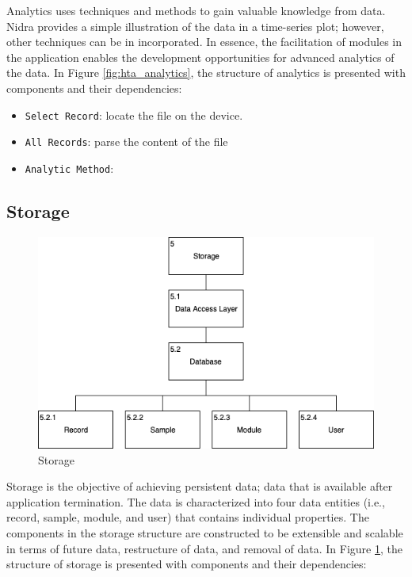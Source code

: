 Analytics uses techniques and methods to gain valuable knowledge from data. Nidra provides a simple illustration of the data in a time-series plot; however, other techniques can be in incorporated. In essence, the facilitation of modules in the application enables the development opportunities for advanced analytics of the data. In Figure \ref{fig:hta_analytics}, the structure of analytics is presented with components and their dependencies: 

\begin{itemize}
    \item[4.1.1] \verb|Select Record|: locate the file on the device.
    \item[4.1.2] \verb|All Records|: parse the content of the file 
    \item[4.2] \verb|Analytic Method|: 
\end{itemize}

\subsection{Storage}

\begin{figure}
    \centering
    \includegraphics[scale=0.6]{images/Storage.png}
    \caption{Storage}
    \label{fig:hta_storage}
\end{figure}

Storage is the objective of achieving persistent data; data that is available after application termination. The data is characterized into four data entities (i.e., record, sample, module, and user) that contains individual properties.  The components in the storage structure are constructed to be extensible and scalable in terms of future data, restructure of data, and removal of data.  In Figure \ref{fig:hta_storage}, the structure of storage is presented with components and their dependencies: 

